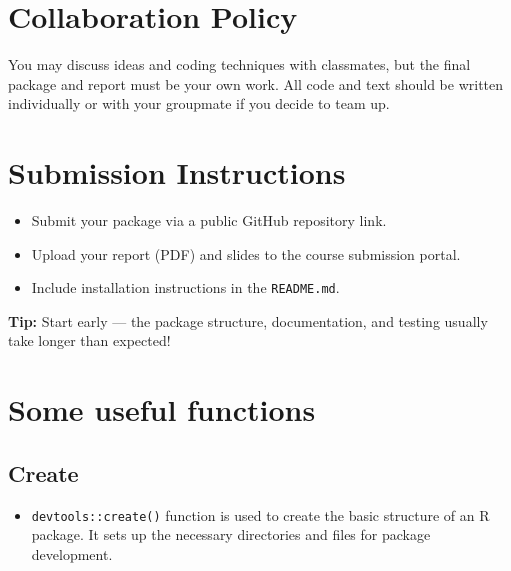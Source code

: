 \documentclass[
  letterpaper,
  DIV=11,
  numbers=noendperiod]{scrreprt}
\providecommand{\tightlist}{%
  \setlength{\itemsep}{0pt}\setlength{\parskip}{0pt}}
\begin{document}
\section{Collaboration Policy}\label{collaboration-policy}

You may discuss ideas and coding techniques with classmates, but the
final package and report must be your own work. All code and text should
be written individually or with your groupmate if you decide to team up.

\section{Submission Instructions}\label{submission-instructions}

\begin{itemize}
\tightlist
\item
  Submit your package via a public GitHub repository link.
\item
  Upload your report (PDF) and slides to the course submission portal.
\item
  Include installation instructions in the \texttt{README.md}.
\end{itemize}

\begin{tcolorbox}[enhanced jigsaw, bottomtitle=1mm, rightrule=.15mm, colframe=quarto-callout-tip-color-frame, coltitle=black, opacitybacktitle=0.6, breakable, colbacktitle=quarto-callout-tip-color!10!white, leftrule=.75mm, toptitle=1mm, titlerule=0mm, toprule=.15mm, opacityback=0, title=\textcolor{quarto-callout-tip-color}{\faLightbulb}\hspace{0.5em}{Tip}, colback=white, arc=.35mm, bottomrule=.15mm, left=2mm]

\textbf{Tip:} Start early --- the package structure, documentation, and
testing usually take longer than expected!

\end{tcolorbox}

\section{Some useful functions}\label{some-useful-functions}

\subsection{Create}\label{create}

\begin{itemize}
\tightlist
\item
  \texttt{devtools::create()} function is used to create the basic
  structure of an R package. It sets up the necessary directories and
  files for package development.
\end{itemize}
\end{document}
